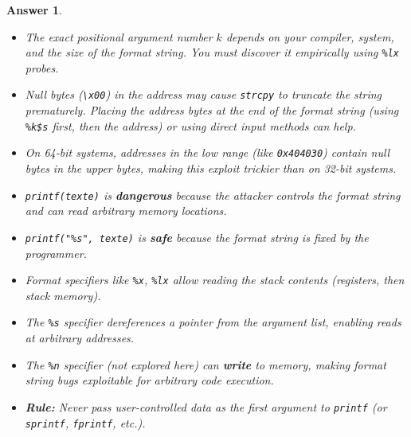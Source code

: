 \documentclass[a4paper,11pt]{article}
\theoremstyle{plain}
\newtheorem{correction}{Answer}
\theoremstyle{definition}
\begin{document}
\begin{correction}
\begin{enumerate}
\begin{attention}
\begin{itemize}
\item The exact positional argument number $k$ depends on your compiler, system, and the size of the format string. You must discover it empirically using \texttt{\%lx} probes.
\item Null bytes (\texttt{\textbackslash x00}) in the address may cause \texttt{strcpy} to truncate the string prematurely. Placing the address bytes at the end of the format string (using \texttt{\%k\$s} first, then the address) or using direct input methods can help.
\item On 64-bit systems, addresses in the low range (like \texttt{0x404030}) contain null bytes in the upper bytes, making this exploit trickier than on 32-bit systems.
\end{itemize}
\end{attention}

\end{enumerate}

\begin{pointcle}
\begin{itemize}
    \item \texttt{printf(texte)} is \textbf{dangerous} because the attacker controls the format string and can read arbitrary memory locations.
    \item \texttt{printf("\%s", texte)} is \textbf{safe} because the format string is fixed by the programmer.
    \item Format specifiers like \texttt{\%x}, \texttt{\%lx} allow reading the stack contents (registers, then stack memory).
    \item The \texttt{\%s} specifier dereferences a pointer from the argument list, enabling reads at arbitrary addresses.
    \item The \texttt{\%n} specifier (not explored here) can \textbf{write} to memory, making format string bugs exploitable for arbitrary code execution.
    \item \textbf{Rule:} \textit{Never} pass user-controlled data as the first argument to \texttt{printf} (or \texttt{sprintf}, \texttt{fprintf}, etc.).
\end{itemize}
\end{pointcle}

\end{correction}
\end{document}
